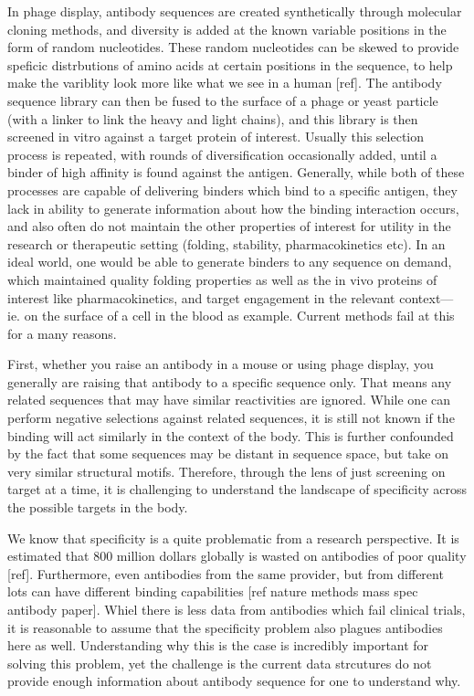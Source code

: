 In phage display, antibody sequences are created synthetically through molecular cloning methods, and diversity is added at the known variable positions in the form of random nucleotides. These random nucleotides can be skewed to provide speficic distrbutions of amino acids at certain positions in the sequence, to help make the variblity look more like what we see in a human [ref]. The antibody sequence library can then be fused to the surface of a phage or yeast particle (with a linker to link the heavy and light chains), and this library is then screened in vitro against a target protein of interest. Usually this selection process is repeated, with rounds of diversification occasionally added, until a binder of high affinity is found against the antigen. Generally, while both of these processes are capable of delivering binders which bind to a specific antigen, they lack in ability to generate information about how the binding interaction occurs, and also often do not maintain the other properties of interest for utility in the research or therapeutic setting (folding, stability, pharmacokinetics etc). 
In an ideal world, one would be able to generate binders to any sequence on demand, which maintained quality folding properties as well as the in vivo proteins of interest like pharmacokinetics, and target engagement in the relevant context--- ie. on the surface of a cell in the blood as example. Current methods fail at this for a many reasons. 

First, whether you raise an antibody in a mouse or using phage display, you generally are raising that antibody to a specific sequence only. That means any related sequences that may have similar reactivities are ignored. While one can perform negative selections against related sequences, it is still not known if the binding will act similarly in the context of the body. This is further confounded by the fact that some sequences may be distant in sequence space, but take on very similar structural motifs. Therefore, through the lens of just screening on target at a time, it is challenging to understand the landscape of specificity across the possible targets in the body. 

We know that specificity is a quite problematic from a research perspective. It is estimated that 800 million dollars globally is wasted on antibodies of poor quality [ref]. Furthermore, even antibodies from the same provider, but from different lots can have different binding capabilities [ref nature methods mass spec antibody paper]. Whiel there is less data from antibodies which fail clinical trials, it is reasonable to assume that the specificity problem also plagues antibodies here as well. Understanding why this is the case is incredibly important for solving this problem, yet the challenge is the current data strcutures do not provide enough information about antibody sequence for one to understand why. 

